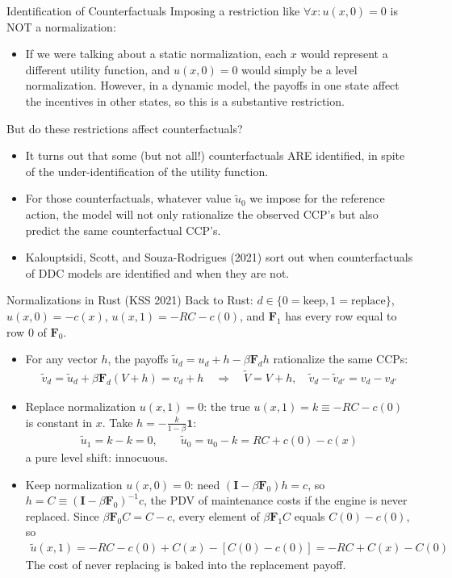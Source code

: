 \documentclass[aspectratio=169,11pt]{beamer}
\begin{document}
\begin{frame}{Identification of Counterfactuals}
Imposing a restriction like $\forall x:u(x,0)=0$
is NOT a normalization:
\begin{itemize}
\item If we were talking
about a static normalization, each $x$ would represent a different
utility function, and $u(x,0)=0$ would simply be a
level normalization. However, in a dynamic model, the payoffs in one
state affect the incentives in other states, so this is a \alert{substantive
restriction.}
\end{itemize}
But do these restrictions affect counterfactuals?
\begin{itemize}
\item It turns out that some (but not all!) counterfactuals ARE identified, in spite of the
under-identification of the utility function.
\item For \alert{those} counterfactuals, whatever value
$\widetilde{u}_{0}$ we impose for the reference action, the model will not only
rationalize the observed CCP's but also predict \alert{the same counterfactual CCP's}.
\item Kalouptsidi, Scott, and Souza-Rodrigues (2021) sort out when counterfactuals
of DDC models are identified and when they are not.
\end{itemize}
\end{frame}

\begin{frame}{Normalizations in Rust (KSS 2021)}
\footnotesize
Back to Rust: $d \in \{0 = \text{keep}, 1 = \text{replace}\}$, $u(x,0) = -c(x)$, $u(x,1) = -RC - c(0)$, and $\symbf{F}_1$ has every row equal to row $0$ of $\symbf{F}_0$.
\begin{itemize}
\item For any vector $h$, the payoffs $\tilde u_d = u_d + h - \beta \symbf{F}_d h$ rationalize the same CCPs:
\begin{align*}
\tilde v_d = \tilde u_d + \beta \symbf{F}_d (V + h) = v_d + h \quad \Rightarrow \quad \tilde V = V + h, \quad \tilde v_d - \tilde v_{d'} = v_d - v_{d'}
\end{align*}
\item \alert{Replace normalization} $u(x,1) = 0$: the true $u(x,1) = k \equiv -RC - c(0)$ is constant in $x$. Take $h = -\frac{k}{1-\beta} \symbf{1}$:
\begin{align*}
\tilde u_1 = k - k = 0, \qquad \tilde u_0 = u_0 - k = RC + c(0) - c(x)
\end{align*}
a pure level shift: innocuous.
\item \alert{Keep normalization} $u(x,0) = 0$: need $(\symbf{I} - \beta \symbf{F}_0) h = c$, so $h = C \equiv (\symbf{I} - \beta\symbf{F}_0)^{-1} c$, the PDV of maintenance costs if the engine is never replaced. Since $\beta \symbf{F}_0 C = C - c$, every element of $\beta \symbf{F}_1 C$ equals $C(0) - c(0)$, so
\begin{align*}
\tilde u(x,1) = -RC - c(0) + C(x) - \left[C(0) - c(0)\right] = -RC + C(x) - C(0)
\end{align*}
The cost of never replacing is baked into the replacement payoff.
\end{itemize}
\end{frame}
\end{document}
